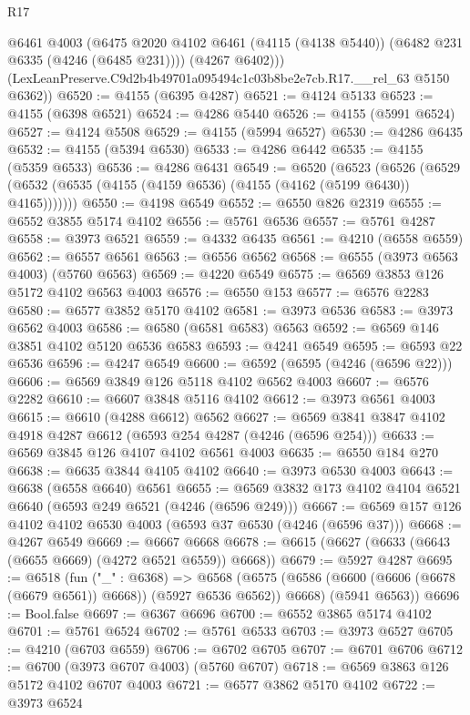 \begin{lexlean}{R17}
\begin{coremodule}
          @6461
          @4003
          (@6475 @2020 @4102 @6461 (@4115 (@4138 @5440)) (@6482 @231 @6335 (@4246 (@6485 @231))))
          (@4267 @6402)))
      (LexLeanPreserve.C9d2b4b49701a095494c1c03b8be2e7cb.R17.__rel_63 @5150 @6362))
@6520 := @4155 (@6395 @4287)
@6521 := @4124 @5133
@6523 := @4155 (@6398 @6521)
@6524 := @4286 @5440
@6526 := @4155 (@5991 @6524)
@6527 := @4124 @5508
@6529 := @4155 (@5994 @6527)
@6530 := @4286 @6435
@6532 := @4155 (@5394 @6530)
@6533 := @4286 @6442
@6535 := @4155 (@5359 @6533)
@6536 := @4286 @6431
@6549 := @6520
    (@6523
      (@6526 (@6529 (@6532 (@6535 (@4155 (@4159 @6536) (@4155 (@4162 (@5199 @6430)) @4165)))))))
@6550 := @4198 @6549
@6552 := @6550 @826 @2319
@6555 := @6552 @3855 @5174 @4102
@6556 := @5761 @6536
@6557 := @5761 @4287
@6558 := @3973 @6521
@6559 := @4332 @6435
@6561 := @4210 (@6558 @6559)
@6562 := @6557 @6561
@6563 := @6556 @6562
@6568 := @6555 (@3973 @6563 @4003) (@5760 @6563)
@6569 := @4220 @6549
@6575 := @6569 @3853 @126 @5172 @4102 @6563 @4003
@6576 := @6550 @153
@6577 := @6576 @2283
@6580 := @6577 @3852 @5170 @4102
@6581 := @3973 @6536
@6583 := @3973 @6562 @4003
@6586 := @6580 (@6581 @6583) @6563
@6592 := @6569 @146 @3851 @4102 @5120 @6536 @6583
@6593 := @4241 @6549
@6595 := @6593 @22 @6536
@6596 := @4247 @6549
@6600 := @6592 (@6595 (@4246 (@6596 @22)))
@6606 := @6569 @3849 @126 @5118 @4102 @6562 @4003
@6607 := @6576 @2282
@6610 := @6607 @3848 @5116 @4102
@6612 := @3973 @6561 @4003
@6615 := @6610 (@4288 @6612) @6562
@6627 := @6569 @3841 @3847 @4102 @4918 @4287 @6612 (@6593 @254 @4287 (@4246 (@6596 @254)))
@6633 := @6569 @3845 @126 @4107 @4102 @6561 @4003
@6635 := @6550 @184 @270
@6638 := @6635 @3844 @4105 @4102
@6640 := @3973 @6530 @4003
@6643 := @6638 (@6558 @6640) @6561
@6655 := @6569 @3832 @173 @4102 @4104 @6521 @6640 (@6593 @249 @6521 (@4246 (@6596 @249)))
@6667 := @6569 @157 @126 @4102 @4102 @6530 @4003 (@6593 @37 @6530 (@4246 (@6596 @37)))
@6668 := @4267 @6549
@6669 := @6667 @6668
@6678 := @6615 (@6627 (@6633 (@6643 (@6655 @6669) (@4272 @6521 @6559)) @6668))
@6679 := @5927 @4287
@6695 := @6518
    (fun ("_" : @6368) =>
    @6568
      (@6575 (@6586 (@6600 (@6606 (@6678 (@6679 @6561)) @6668)) (@5927 @6536 @6562)) @6668)
      (@5941 @6563))
@6696 := Bool.false
@6697 := @6367 @6696
@6700 := @6552 @3865 @5174 @4102
@6701 := @5761 @6524
@6702 := @5761 @6533
@6703 := @3973 @6527
@6705 := @4210 (@6703 @6559)
@6706 := @6702 @6705
@6707 := @6701 @6706
@6712 := @6700 (@3973 @6707 @4003) (@5760 @6707)
@6718 := @6569 @3863 @126 @5172 @4102 @6707 @4003
@6721 := @6577 @3862 @5170 @4102
@6722 := @3973 @6524

\end{coremodule}
\end{lexlean}
